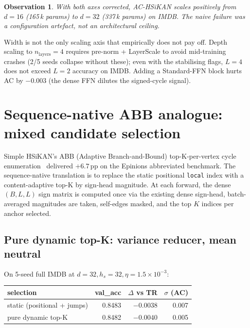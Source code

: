 \documentclass[11pt, a4paper]{article}
\newtheorem{observation}{Observation}
\begin{document}
\begin{observation}
With both axes corrected, AC-HSiKAN scales positively from $d=16$
(165\,k params) to $d=32$ (337\,k params) on IMDB. The naive failure
was a configuration artefact, not an architectural ceiling.
\end{observation}

Width is not the only scaling axis that empirically does not pay off.
Depth scaling to $n_{\text{layers}} = 4$ requires pre-norm + LayerScale
to avoid mid-training crashes (2/5 seeds collapse without these); even
with the stabilising flags, $L=4$ does not exceed $L=2$ accuracy on
IMDB. Adding a Standard-FFN block hurts AC by $-0.003$ (the dense FFN
dilutes the signed-cycle signal).

\section{Sequence-native ABB analogue: mixed candidate selection}
\label{sec:abb}

Simple HSiKAN's ABB (Adaptive Branch-and-Bound) top-K-per-vertex cycle
enumeration~\cite{hsikan2026internal} delivered $+6.7$\,pp on the
Epinions abbreviated benchmark. The sequence-native translation is to
replace the static positional \texttt{local} index with a content-adaptive
top-K by sign-head magnitude. At each forward, the dense $(B, L, L)$
sign matrix is computed once via the existing dense sign-head,
batch-averaged magnitudes are taken, self-edges masked, and the top
$K$ indices per anchor selected.

\subsection{Pure dynamic top-K: variance reducer, mean neutral}

On 5-seed full IMDB at $d=32, h_s = 32, \eta = 1.5\!\times\!10^{-3}$:

\begin{center}
\begin{tabular}{lrrr}
\toprule
selection & val\_acc & $\Delta$ vs TR & $\sigma$ (AC) \\
\midrule
static (positional + jumps) & 0.8483 & $-0.0038$ & 0.007 \\
pure dynamic top-K          & 0.8482 & $-0.0040$ & 0.005 \\
\bottomrule
\end{tabular}
\end{center}
\end{document}
